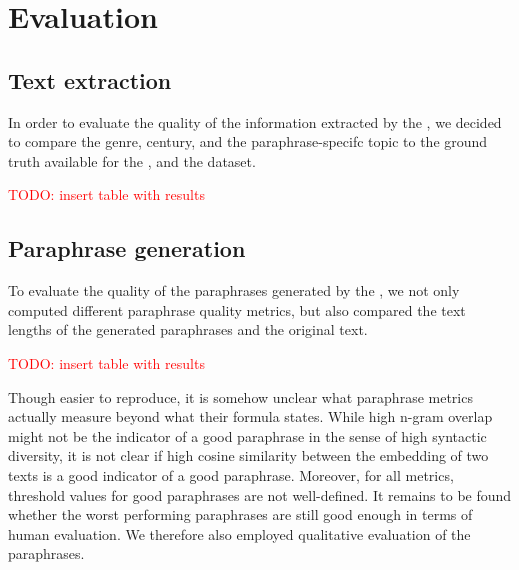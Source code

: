 \chapter{Evaluation}
\label{chap:evaluation}

\section{Text extraction}
\label{sec:text_extraction}

In order to evaluate the quality of the information extracted by the \pextractor{}, 
we decided to compare the genre, century, and the paraphrase-specifc topic to the 
ground truth available for the \dataBlog{}, \dataGutenberg{} and the \dataCustom{} dataset.

\textcolor{red}{TODO: insert table with results}

\section{Paraphrase generation}
\label{sec:paraphrase_generation}
To evaluate the quality of the paraphrases generated by the \pgenerator{}, 
we not only computed different paraphrase quality metrics, 
but also compared the text lengths of the generated paraphrases and the original text.

\textcolor{red}{TODO: insert table with results}

Though easier to reproduce, it is somehow unclear what paraphrase metrics actually measure beyond what their formula states.
While high n-gram overlap might not be the indicator of a good paraphrase in the sense of high syntactic diversity, 
it is not clear if high cosine similarity between the embedding of two texts is a good indicator of a good paraphrase.
Moreover, for all metrics, threshold values for good paraphrases are not well-defined.
It remains to be found whether the worst performing paraphrases are still good enough in terms of human evaluation.
We therefore also employed qualitative evaluation of the paraphrases.